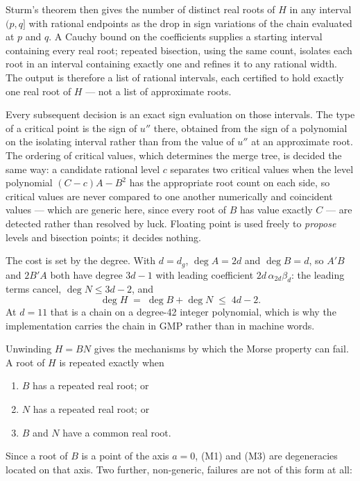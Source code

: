 \documentclass[11pt]{article}
\theoremstyle{plain}
\theoremstyle{definition}
\theoremstyle{remark}
\begin{document}
Sturm's theorem then gives the number of distinct real roots of $H$ in any
interval $(p, q]$ with rational endpoints as the drop in sign variations of
the chain evaluated at $p$ and $q$. A Cauchy bound on the coefficients
supplies a starting interval containing every real root; repeated bisection,
using the same count, isolates each root in an interval containing exactly one
and refines it to any rational width. The output is therefore a list of
rational intervals, each certified to hold exactly one real root of $H$ --- not
a list of approximate roots.

Every subsequent decision is an exact sign evaluation on those intervals. The
type of a critical point is the sign of $u''$ there, obtained from the sign of
a polynomial on the isolating interval rather than from the value of $u''$ at
an approximate root. The ordering of critical values, which determines the
merge tree, is decided the same way: a candidate rational level $c$ separates
two critical values when the level polynomial $(C-c)A - B^2$ has the
appropriate root count on each side, so critical values are never compared to
one another numerically and coincident values --- which are generic here,
since every root of $B$ has value exactly $C$ --- are detected rather than
resolved by luck. Floating point is used freely to \emph{propose} levels and
bisection points; it decides nothing.

The cost is set by the degree. With $d = d_g$, $\deg A = 2d$ and
$\deg B = d$, so $A'B$ and $2B'A$ both have degree $3d-1$ with leading
coefficient $2d\,\alpha_{2d}\beta_d$: the leading terms cancel, $\deg N \leq
3d-2$, and
\[
  \deg H \;=\; \deg B + \deg N \;\leq\; 4d - 2 .
\]
At $d = 11$ that is a chain on a degree-42 integer polynomial, which is why
the implementation carries the chain in GMP rather than in machine words.

Unwinding $H = BN$ gives the mechanisms by which the Morse property can fail.
A root of $H$ is repeated exactly when

\begin{enumerate}
\item[(M1)] $B$ has a repeated real root; or
\item[(M2)] $N$ has a repeated real root; or
\item[(M3)] $B$ and $N$ have a common real root.
\end{enumerate}

Since a root of $B$ is a point of the axis $a = 0$, (M1) and (M3) are
degeneracies located on that axis. Two further, non-generic, failures are not
of this form at all:
\end{document}
